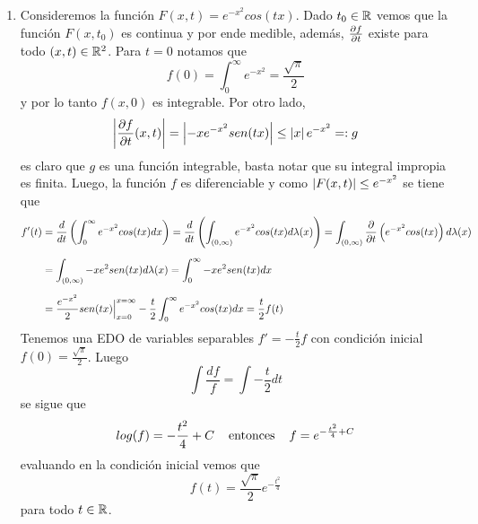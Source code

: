 \documentclass{article}
\begin{document}
\begin{enumerate}
    \item Consideremos la función $F(x,t)=e^{-x^{2}}cos(tx)$. Dado $t_{0}\in\mathbb{R}$ vemos que la 
    función $F(x,t_{0})$ es continua y por ende medible, además, $\frac{\partial f}{\partial t}$ existe para todo
    $(x,t)\in\mathbb{R}^{2}$. Para $t=0$ notamos que
    \begin{equation*}
        f(0)=\int_{0}^{\infty}e^{-x^{2}}=\frac{\sqrt{\pi}}{2}
    \end{equation*}
    y por lo tanto $f(x,0)$ es integrable. Por otro lado,
    \begin{equation*}
        \left|\frac{\partial f}{\partial t}(x,t) \right|=\left|-xe^{-x^{2}}sen(tx) \right|\leq \left|x \right|e^{-x^{2}}=:g
    \end{equation*}
    es claro que $g$ es una función integrable, basta notar que su integral impropia es finita.
    Luego, la función $f$ es diferenciable y como 
    $\left|F(x,t) \right|\leq e^{-x^{2}}$ se tiene que
    \begin{align*}
        f'(t) &= \frac{d}{dt}\left(\int_{0}^{\infty}e^{-x^{2}}cos(tx)dx\right)
        =\frac{d}{dt}\left(\int_{(0,\infty)}e^{-x^{2}}cos(tx)d\lambda(x)\right)
        =\int_{(0,\infty)}\frac{\partial}{\partial t}\left(e^{-x^{2}}cos(tx)\right)d\lambda(x) \\[2mm]
        &= \int_{(0,\infty)}-xe^{2}sen(tx)d\lambda(x)=\int_{0}^{\infty}-xe^{2}sen(tx)dx \\[2mm]
        &=\frac{e^{-x^{2}}}{2}sen(tx)\Big|_{x=0}^{x=\infty}
        -\frac{t}{2}\int_{0}^{\infty}e^{-x^{2}}cos(tx)dx=\frac{t}{2}f(t)
    \end{align*}
    Tenemos una EDO de variables separables $f'=-\frac{t}{2}f$ con condición inicial
    $f(0)=\frac{\sqrt{\pi}}{2}$. Luego
    \begin{equation*}
        \int\frac{df}{f}=\int-\frac{t}{2}dt
    \end{equation*}
    se sigue que
    \begin{equation*}
        log(f)=-\frac{t^{2}}{4}+C\hspace{4mm}\text{entonces}\hspace{4mm}f=e^{-\frac{t^{2}}{4}+C}
    \end{equation*}
    evaluando en la condición inicial vemos que
    \begin{equation*}
        f(t)=\frac{\sqrt{\pi}}{2}e^{-\frac{t^{2}}{4}}
    \end{equation*}
    para todo $t\in\mathbb{R}$.
    

\end{enumerate}
\end{document}
